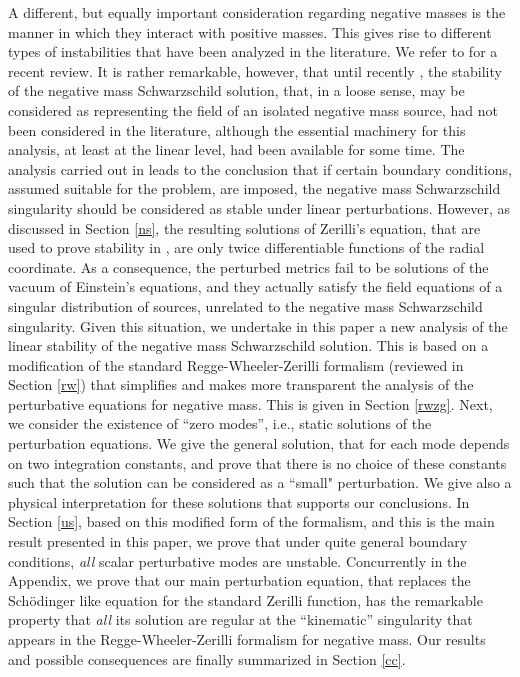 \documentclass[12pt,aps,floats,showpacs,amssymb,tightenlines]{revtex4}
\begin{document}
A different, but equally important consideration regarding negative masses is the manner
in which they interact with positive masses. This gives rise to different types of
instabilities that have been analyzed in the literature. We refer to \cite{ghi} for a
recent review. It is rather remarkable, however, that until recently \cite{ghi}, the stability
of the negative mass Schwarzschild solution, that, in a loose sense, may be considered as representing
the field of an isolated negative mass source, had not been considered in the literature, although the
 essential machinery for this analysis, at least at the linear level, had been available for some time.
 The analysis carried out in \cite{ghi} leads to the conclusion that if certain boundary conditions,
 assumed suitable for the problem, are imposed, the negative mass Schwarzschild singularity should be considered as
 stable under linear perturbations. However, as discussed in Section \ref{ns}, the resulting solutions of Zerilli's equation, that are used to prove stability in
 \cite{ghi}, are only twice differentiable functions  of the radial coordinate. As a consequence, the
 perturbed metrics fail to be solutions of the vacuum of Einstein's equations, and they
 actually satisfy the field equations of a singular distribution of sources, unrelated to the negative mass Schwarzschild singularity.
  Given this situation, we undertake in this paper
 a new analysis of the linear stability of the negative mass Schwarzschild solution. This is based on
 a modification of the standard Regge-Wheeler-Zerilli formalism (reviewed in Section \ref{rw})
  that simplifies and makes more
 transparent the analysis of the perturbative equations for negative mass. This is given in Section
 \ref{rwzg}.
  Next, we consider the existence of ``zero modes'', i.e., static solutions of the perturbation equations.
   We give the general solution, that for each mode depends on two integration constants, and prove that
    there is no choice of these constants such that the solution can be considered as a ``small"
    perturbation. We give also a physical interpretation for these solutions that supports our
    conclusions. In Section \ref{us}, based on this modified form of the formalism, and this is the
     main result presented in this paper, we prove that under quite general boundary conditions,
      {\em all} scalar perturbative modes are unstable. Concurrently in the Appendix, we prove
      that our main perturbation equation, that replaces the Sch\"odinger like equation for the
      standard Zerilli function, has the remarkable property that {\em all} its solution are
      regular at the ``kinematic'' singularity that appears in the Regge-Wheeler-Zerilli formalism
       for negative mass. Our results and possible consequences are finally summarized in Section \ref{cc}.
\end{document}
